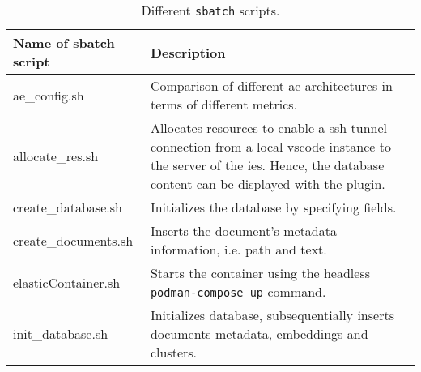 \begin{table}[]
    \caption{Different \texttt{sbatch} scripts.}
    \begin{tabular}{|
    >{\columncolor[HTML]{EFEFEF}}p{} |p{}|}
    \hline
    \cellcolor[HTML]{C0C0C0}\textbf{Name of sbatch script} & \cellcolor[HTML]{C0C0C0}\textbf{Description}                                                                                                                                                                                                                      \\ \hline
    ae\_config.sh                                          & Comparison of different \ac{ae} architectures in terms of different metrics.                                                                                                                                                                     \\ \hline
    allocate\_res.sh                                       & Allocates resources to enable a \ac{ssh} tunnel connection from a local \ac{vscode} instance to the server of the \ac{ies}. 
                                                                Hence, the database content can be displayed with the \databaseName{} plugin.\\ \hline
    create\_database.sh                                    & Initializes the database by specifying fields.                                                                                                                                                                                                                    \\ \hline
    create\_documents.sh                                   & Inserts the document's metadata information, i.e. path and text.                                                                                                                                                                                                   \\ \hline
    elasticContainer.sh                                    & Starts the \databaseName{} container using the headless \texttt{podman-compose up} command.                                                                                                                                     \\ \hline
    init\_database.sh                                      & Initializes database, subsequentially inserts documents metadata, embeddings and clusters.                                                                                                                                                                        \\ \hline

\end{tabular}
\end{table}
